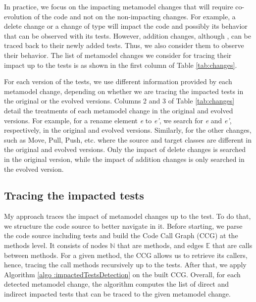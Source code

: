 \blue{}In practice, we focus on the impacting metamodel changes that will require co-evolution of the code and not on the non-impacting changes. For example, a delete change or a change of type will impact the code and possibly its behavior that can be observed with its tests. 
However, addition changes, although , can be traced back to their newly added tests. Thus, we also consider them to observe their behavior.
The list of metamodel changes \cite{iovino2012impact,cicchetti_managing_2009} we consider for tracing their impact up to the tests is as shown in the first column of Table \ref{tab:changes}. 

For each version of the tests, we use different information provided by each metamodel change, depending on whether we are tracing the impacted tests in the original or the evolved versions. Columns 2 and 3 of Table \ref{tab:changes} detail the treatments of each metamodel change in the original and evolved versions. For example, for a rename element \emph{e} to \emph{e'}, we search for \emph{e} and \emph{e'}, respectively, in the original and evolved versions. Similarly, for the other changes, such as Move, Pull, Push, etc. where the source and target classes are different in the original and evolved versions. Only the impact of delete changes is searched in the original version, while the impact of addition changes is only searched in the evolved version. 





\subsection{Tracing the impacted tests}
\label{section: tracing the impacted tests}
\red{}


My approach traces the impact of metamodel changes up to the test. To do that, we structure the code source to better navigate in it. 
Before starting, we parse the code source including tests and build the Code Call Graph (CCG) at the methods level. It consists of nodes $\mathbb{N}$ that are methods, and edges $\mathbb{E}$ that are calls between methods. 
For a given method, the CCG allows us to retrieve its callers, hence, tracing the call methods recursively up to the tests. %
After that, we apply Algorithm \ref{algo :impactedTestsDetection} on the built CCG. Overall, for each detected metamodel change, the algorithm computes the list of direct and indirect impacted tests that can be traced to the given metamodel change. 



